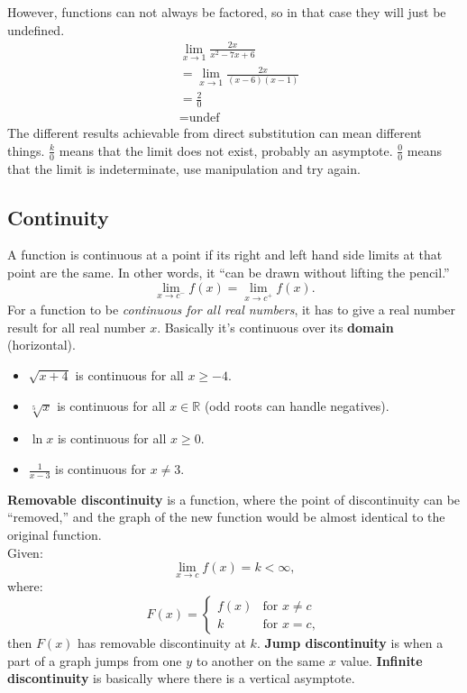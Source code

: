 \documentclass[12pt]{article}
\begin{document}
            \newline
            However, functions can not always be factored, so in that case they will just be undefined.
            \newline
            \begin{align*}
                &\lim_{x \to 1} \frac{2x}{x^2 - 7x + 6} \\[6pt]
                &= \lim_{x \to 1} \frac{2x}{(x-6)(x-1)} \\
                &= \frac{2}{0} \\
                &= \text{undef}
            \end{align*}
            \newline
            The different results achievable from direct substitution can mean different things. $\frac{k}{0}$ means that the limit does not exist, probably an asymptote. $\frac{0}{0}$ means that the limit is indeterminate, use manipulation and try again.

        \subsection{Continuity}
            A function is continuous at a point if its right and left hand side limits at that point are the same. In other words, it ``can be drawn without lifting the pencil.''
            \[ \lim_{x \to c^-} f(x) = \lim_{x \to c^+} f(x).\]
            For a function to be \textit{continuous for all real numbers}, it has to give a real number result for all real number $x$. Basically it's continuous
            over its \textbf{domain} (horizontal).
            \begin{itemize}
                \item $\sqrt{x+4}$ is continuous for all $x \ge -4$.
                \item $\sqrt[5]{x}$ is continuous for all $x \in \mathbb{R}$ (odd roots can handle negatives).
                \item $\ln{x}$ is continuous for all $x \ge 0$.
                \item $\frac{1}{x-3}$ is continuous for $x \ne 3$.
            \end{itemize}
            \textbf{Removable discontinuity} is a function, where the point of discontinuity can be ``removed,'' and the graph of the new function would be almost identical to the original function.
            \\ Given:
            \[ \lim_{x \to c} f(x) = k < \infty, \]
            where:
            \[ F(x) = \begin{cases}
                f(x) &\text{for } x \ne c \\
                k &\text{for } x = c,
            \end{cases} \]
            then $F(x)$ has removable discontinuity at $k$.
            \newline
            \textbf{Jump discontinuity} is when a part of a graph jumps from one $y$ to another on the same $x$ value. %
            \newline
            \textbf{Infinite discontinuity} is basically where there is a vertical asymptote.
\end{document}
